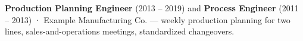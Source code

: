 \item \textbf{Production Planning Engineer} (2013 -- 2019) and \textbf{Process Engineer} (2011 -- 2013)
  · Example Manufacturing Co. — weekly production planning for two lines, sales-and-operations meetings,
  standardized changeovers.

